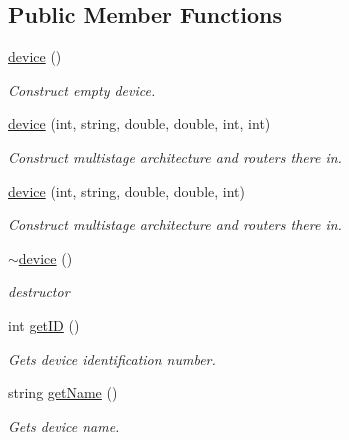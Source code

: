 \subsection*{Public Member Functions}
\begin{DoxyCompactItemize}
\item 
\hyperlink{classdevice_a95ab42e0b2e738637d3414347fa5559c}{device} ()
\begin{DoxyCompactList}\small\item\em Construct empty device. \item\end{DoxyCompactList}\item 
\hyperlink{classdevice_a57b9c4ac7a8bd970b81b1154ae79a5de}{device} (int, string, double, double, int, int)
\begin{DoxyCompactList}\small\item\em Construct multistage architecture and routers there in. \item\end{DoxyCompactList}\item 
\hyperlink{classdevice_a3aa4a2a68f49628354dbe33de584f726}{device} (int, string, double, double, int)
\begin{DoxyCompactList}\small\item\em Construct multistage architecture and routers there in. \item\end{DoxyCompactList}\item 
\hyperlink{classdevice_a08545ac77231c68a27c32633a9730a33}{$\sim$device} ()
\begin{DoxyCompactList}\small\item\em destructor \item\end{DoxyCompactList}\item 
int \hyperlink{classdevice_a5b73405bc8184085f92306d4f323b572}{getID} ()
\begin{DoxyCompactList}\small\item\em Gets device identification number. \item\end{DoxyCompactList}\item 
string \hyperlink{classdevice_a9dc7119476febd7ba47060d74ba37e20}{getName} ()
\begin{DoxyCompactList}\small\item\em Gets device name. \item\end{DoxyCompactList}\item 

\end{DoxyCompactItemize}
